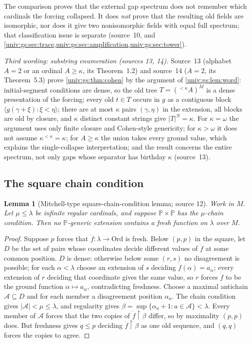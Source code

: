 \documentclass[11pt,letterpaper]{article}
\numberwithin{equation}{section}
\newtheorem{lemma}[lemma]{Lemma}
\theoremstyle{definition}
\theoremstyle{remark}
\newcommand{\Ord}{\mathrm{Ord}}
\newcommand{\res}{\mathbin{\upharpoonright}}
\newcommand{\abs}[1]{\lvert#1\rvert}
\newcommand{\seq}[1]{\langle#1\rangle}
\begin{document}
The comparison proves that the external gap spectrum does not remember which
cardinals the forcing collapsed. It does \emph{not} prove that the resulting old
fields are isomorphic, nor does it give two nonisomorphic fields with equal full
spectrum; that classification issue is separate (source~10, and
\cref{univ:gs:sec:trace,univ:gs:sec:amplification,univ:gs:sec:tower}).

\emph{Third wording: substring enumeration (sources 13, 14).} Source~13 (alphabet
$A=2$ or an ordinal $A\ge\kappa$, its Theorem~1.2) and source~14 ($A=2$, its
Theorem~5.3) prove \cref{univ:gs:thm:cohen} by the argument of
\cref{univ:gs:lem:word}: initial-segment conditions are dense, so the old tree
$T=({}^{<\kappa}A)^M$ is a dense presentation of the forcing; every old $t\in T$
occurs in $g$ as a contiguous block $\seq{g(\gamma+\xi):\xi<\eta}$; there are at
most $\kappa$ pairs $(\gamma,\eta)$ in the extension, all blocks are old by
closure, and $\kappa$ distinct constant strings give $\abs T^N=\kappa$. For
$\kappa=\omega$ the argument uses only finite closure and Cohen-style genericity;
for $\kappa>\omega$ it does not assume $\kappa^{<\kappa}=\kappa$; for $A\ge\kappa$
the union takes every ground value, which explains the single-collapse
interpretation; and the result concerns the entire spectrum, not only gaps whose
separator has birthday $\kappa$ (source~13).

\subsection{The square chain condition}\label{univ:gs:sub:square}

\begin{lemma}[Mitchell-type square-chain-condition lemma; source 12]\label{univ:gs:lem:square}
Work in $M$. Let $\mu\le\lambda$ be infinite regular cardinals, and suppose
$\mathbb P\times\mathbb P$ has the $\mu$-chain condition. Then no $\mathbb P$-generic
extension contains a fresh function on $\lambda$ over $M$.
\end{lemma}
\begin{proof}
Suppose $p$ forces that $\dot f:\lambda\to\Ord$ is fresh. Below $(p,p)$ in the square,
let $D$ be the set of pairs whose coordinates decide different values of $\dot f$ at
some common position. $D$ is dense: otherwise below some $(r,s)$ no disagreement is
possible; for each $\alpha<\lambda$ choose an extension of $s$ deciding
$\dot f(\alpha)=a_\alpha$; every extension of $r$ deciding that coordinate gives the
same value, so $r$ forces $\dot f$ to be the ground function $\alpha\mapsto a_\alpha$,
contradicting freshness. Choose a maximal antichain $\mathcal A\subseteq D$ and for
each member a disagreement position $\alpha_a$. The chain condition gives
$\abs{\mathcal A}<\mu\le\lambda$, and regularity gives
$\beta=\sup\{\alpha_a+1:a\in\mathcal A\}<\lambda$. Every member of $\mathcal A$ forces
that the two copies of $\dot f\res\beta$ differ, so by maximality $(p,p)$ does. But
freshness gives $q\le p$ deciding $\dot f\res\beta$ as one old sequence, and $(q,q)$
forces the copies to agree.
\end{proof}
\end{document}
